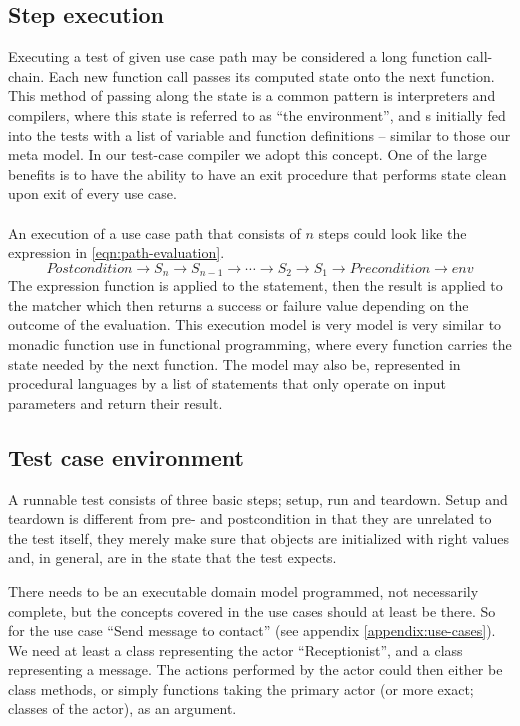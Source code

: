 \subsection{Step execution}
\label{sec:step-execution}
\label{sec:use-case-environment}
Executing a test of given use case path may be considered a long function call-chain. Each new function call passes its computed state onto the next function. This method of passing along the state is a common pattern is interpreters and compilers, where this state is referred to as ``the environment'', and s initially fed into the tests with a list of variable and function definitions -- similar to those our meta model. In our test-case compiler we adopt this concept. One of the large benefits is to have the ability to have an exit procedure that performs state clean upon exit of every use case.\\\\
An execution of a use case path that consists of $n$ steps could look like the expression in \ref{eqn:path-evaluation}. 
\begin{equation}
Postcondition \rightarrow S_n \rightarrow S_{n-1} \rightarrow \dotsb \rightarrow S_2 \rightarrow S_1 \rightarrow Precondition \rightarrow env
\label{eqn:path-evaluation}
\end{equation}
The expression function is applied to the statement, then the result is applied to the matcher which then returns a success or failure value depending on the outcome of the evaluation. This execution model is very model is very similar to monadic function use in functional programming, where every function carries the state needed by the next function. The model may also be, represented in procedural languages by a list of statements that only operate on input parameters and return their result.

\subsection{Test case environment}
\label{sec:test_case_state}

A runnable test consists of three basic steps; setup, run and teardown. Setup and teardown is different from pre- and postcondition in that they are unrelated to the test itself, they merely make sure that objects are initialized with right values and, in general, are in the state that the test expects.

There needs to be an executable domain model programmed, not necessarily complete, but the concepts covered in the use cases should at least be there. So for the use case ``Send message to contact'' (see appendix \ref{appendix:use-cases}). We need at least a class representing the actor ``Receptionist'', and a class representing a message. The actions performed by the actor could then either be class methods, or simply functions taking the primary actor (or more exact; classes of the actor), as an argument.

